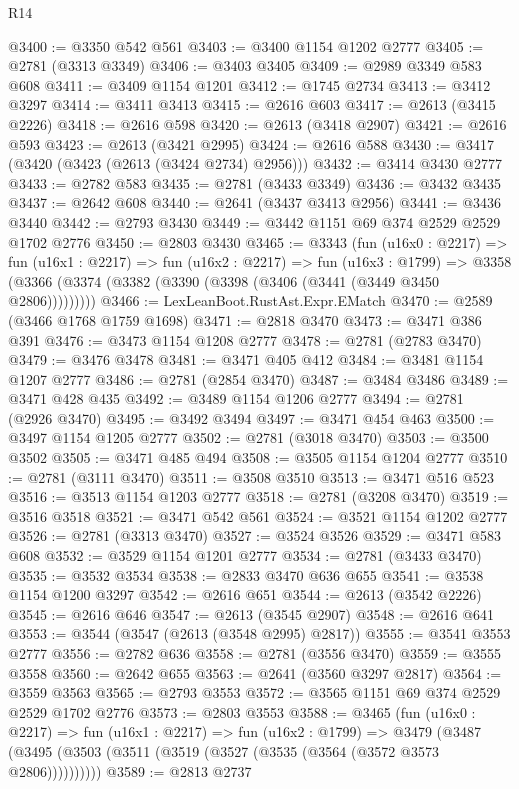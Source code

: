 \begin{lexlean}{R14}
\begin{coremodule}
@3400 := @3350 @542 @561
@3403 := @3400 @1154 @1202 @2777
@3405 := @2781 (@3313 @3349)
@3406 := @3403 @3405
@3409 := @2989 @3349 @583 @608
@3411 := @3409 @1154 @1201
@3412 := @1745 @2734
@3413 := @3412 @3297
@3414 := @3411 @3413
@3415 := @2616 @603
@3417 := @2613 (@3415 @2226)
@3418 := @2616 @598
@3420 := @2613 (@3418 @2907)
@3421 := @2616 @593
@3423 := @2613 (@3421 @2995)
@3424 := @2616 @588
@3430 := @3417 (@3420 (@3423 (@2613 (@3424 @2734) @2956)))
@3432 := @3414 @3430 @2777
@3433 := @2782 @583
@3435 := @2781 (@3433 @3349)
@3436 := @3432 @3435
@3437 := @2642 @608
@3440 := @2641 (@3437 @3413 @2956)
@3441 := @3436 @3440
@3442 := @2793 @3430
@3449 := @3442 @1151 @69 @374 @2529 @2529 @1702 @2776
@3450 := @2803 @3430
@3465 := @3343
    (fun (u16x0 : @2217) =>
    fun (u16x1 : @2217) =>
    fun (u16x2 : @2217) =>
    fun (u16x3 : @1799) =>
    @3358 (@3366 (@3374 (@3382 (@3390 (@3398 (@3406 (@3441 (@3449 @3450 @2806)))))))))
@3466 := LexLeanBoot.RustAst.Expr.EMatch
@3470 := @2589 (@3466 @1768 @1759 @1698)
@3471 := @2818 @3470
@3473 := @3471 @386 @391
@3476 := @3473 @1154 @1208 @2777
@3478 := @2781 (@2783 @3470)
@3479 := @3476 @3478
@3481 := @3471 @405 @412
@3484 := @3481 @1154 @1207 @2777
@3486 := @2781 (@2854 @3470)
@3487 := @3484 @3486
@3489 := @3471 @428 @435
@3492 := @3489 @1154 @1206 @2777
@3494 := @2781 (@2926 @3470)
@3495 := @3492 @3494
@3497 := @3471 @454 @463
@3500 := @3497 @1154 @1205 @2777
@3502 := @2781 (@3018 @3470)
@3503 := @3500 @3502
@3505 := @3471 @485 @494
@3508 := @3505 @1154 @1204 @2777
@3510 := @2781 (@3111 @3470)
@3511 := @3508 @3510
@3513 := @3471 @516 @523
@3516 := @3513 @1154 @1203 @2777
@3518 := @2781 (@3208 @3470)
@3519 := @3516 @3518
@3521 := @3471 @542 @561
@3524 := @3521 @1154 @1202 @2777
@3526 := @2781 (@3313 @3470)
@3527 := @3524 @3526
@3529 := @3471 @583 @608
@3532 := @3529 @1154 @1201 @2777
@3534 := @2781 (@3433 @3470)
@3535 := @3532 @3534
@3538 := @2833 @3470 @636 @655
@3541 := @3538 @1154 @1200 @3297
@3542 := @2616 @651
@3544 := @2613 (@3542 @2226)
@3545 := @2616 @646
@3547 := @2613 (@3545 @2907)
@3548 := @2616 @641
@3553 := @3544 (@3547 (@2613 (@3548 @2995) @2817))
@3555 := @3541 @3553 @2777
@3556 := @2782 @636
@3558 := @2781 (@3556 @3470)
@3559 := @3555 @3558
@3560 := @2642 @655
@3563 := @2641 (@3560 @3297 @2817)
@3564 := @3559 @3563
@3565 := @2793 @3553
@3572 := @3565 @1151 @69 @374 @2529 @2529 @1702 @2776
@3573 := @2803 @3553
@3588 := @3465
    (fun (u16x0 : @2217) =>
    fun (u16x1 : @2217) =>
    fun (u16x2 : @1799) =>
    @3479 (@3487 (@3495 (@3503 (@3511 (@3519 (@3527 (@3535 (@3564 (@3572 @3573 @2806))))))))))
@3589 := @2813 @2737

\end{coremodule}
\end{lexlean}
